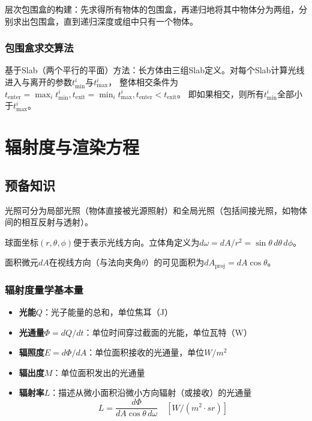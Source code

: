 \documentclass[12pt]{article}
\begin{document}
层次包围盒的构建：先求得所有物体的包围盒，再递归地将其中物体分为两组，分别求出包围盒，直到递归深度或组中只有一个物体。

\subsubsection{包围盒求交算法}
基于Slab（两个平行的平面）方法：长方体由三组Slab定义。对每个Slab计算光线进入与离开的参数$t_{\text{min}}^i$与$t_{\text{max}}^i$，
整体相交条件为$t_{\text{enter}} = \max_i t_{\text{min}}^i, t_{\text{exit}} = \min_i t_{\text{max}}^i, t_{\text{enter}} < t_{\text{exit}}$。
即如果相交，则所有$t_{\text{min}}^i$全部小于$t_{\text{max}}^i$。

\newpage

\section{辐射度与渲染方程}

\subsection{预备知识}

光照可分为局部光照（物体直接被光源照射）和全局光照（包括间接光照，如物体间的相互反射与透射）。

球面坐标$(r,\theta,\phi)$便于表示光线方向。立体角定义为$d\omega = dA/r^2 = \sin\theta \, d\theta \, d\phi$。

面积微元$dA$在视线方向（与法向夹角$\theta$）的可见面积为$dA_{\text{proj}} = dA \cos\theta$。

\subsubsection*{辐射度量学基本量}

\begin{itemize}
    \item \textbf{光能$Q$}：光子能量的总和，单位焦耳（J）
    \item \textbf{光通量$\Phi = dQ/dt$}：单位时间穿过截面的光能，单位瓦特（W）
    \item \textbf{辐照度$E = d\Phi / dA$}：单位面积接收的光通量，单位$W/m^2$
    \item \textbf{辐出度$M$}：单位面积发出的光通量
    \item \textbf{辐射率$L$}：描述从微小面积沿微小方向辐射（或接收）的光通量
    $$L = \frac{d\Phi}{dA \cos\theta \, d\omega} \quad [W/(m^2 \cdot sr)]$$
\end{itemize}
\end{document}
